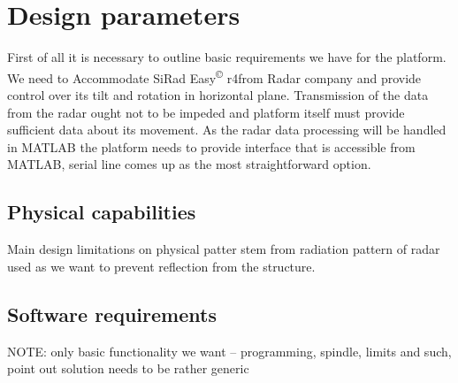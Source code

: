
\def\PageLayout{single-no-print}
\def\DocLanguage{en}
\def\PackagesIncludeTikz{yes}
\def\PackagesIncludeBib{yes}







\usepackage{lipsum}  %

\newcommand{\sidar}{SiRad Easy\textsuperscript{\copyright} r4}





\tableofcontents

\newpage
{}
\setcounter{page}{1}


\pagestyle{fancy}


\chapter{Design parameters}

First of all it is necessary to outline basic requirements we have for the platform. We need to Accommodate \sidar from Radar company and provide control over its tilt and rotation in horizontal plane. Transmission of the data from the radar ought not to be impeded and platform itself must provide sufficient data about its movement. As the radar data processing will be handled in MATLAB the platform needs to provide interface that is accessible from MATLAB, serial line comes up as the most straightforward option.

\section{Physical capabilities}


Main design limitations on physical patter stem from radiation pattern of radar used as we want to prevent reflection from the structure.


\section{Software requirements}

NOTE: only basic functionality we want -- programming, spindle, limits and such, point out solution needs to be rather generic

